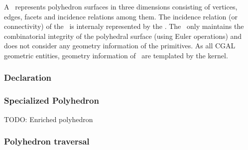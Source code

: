 A \cgalpoly\ represents polyhedron surfaces in three dimensions
consisting of vertices, edges, facets and incidence relations among them.
The incidence relation (or connectivity) of the \poly\ is
internaly represented by the \cgalhds . 
The \poly\ only maintains the combinatorial integrity of the 
polyhedral surface (using Euler operations) and does not 
consider any geometry information of the primitives. 
As all CGAL geometric entities, geometry information of \poly\ 
are templated by the kernel.

\subsubsection{Declaration}


\subsubsection{Specialized Polyhedron}
TODO: Enriched polyhedron
%

\subsubsection{Polyhedron traversal}

